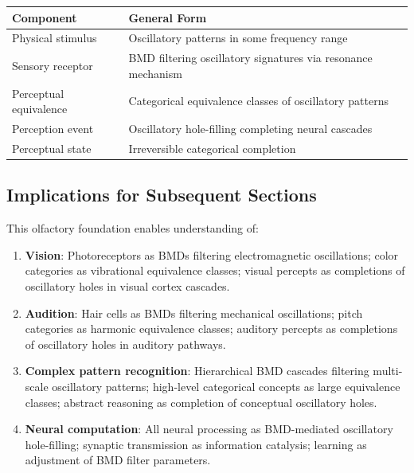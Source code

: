 \documentclass[12pt,a4paper]{article}
\begin{document}
\begin{center}
\begin{tabular}{p{4cm}p{10cm}}
\toprule
\textbf{Component} & \textbf{General Form} \\
\midrule
Physical stimulus & Oscillatory patterns in some frequency range \\
Sensory receptor & BMD filtering oscillatory signatures via resonance mechanism \\
Perceptual equivalence & Categorical equivalence classes of oscillatory patterns \\
Perception event & Oscillatory hole-filling completing neural cascades \\
Perceptual state & Irreversible categorical completion \\
\bottomrule
\end{tabular}
\end{center}

\subsection{Implications for Subsequent Sections}

This olfactory foundation enables understanding of:

\begin{enumerate}
\item \textbf{Vision}: Photoreceptors as BMDs filtering electromagnetic oscillations; color categories as vibrational equivalence classes; visual percepts as completions of oscillatory holes in visual cortex cascades.

\item \textbf{Audition}: Hair cells as BMDs filtering mechanical oscillations; pitch categories as harmonic equivalence classes; auditory percepts as completions of oscillatory holes in auditory pathways.

\item \textbf{Complex pattern recognition}: Hierarchical BMD cascades filtering multi-scale oscillatory patterns; high-level categorical concepts as large equivalence classes; abstract reasoning as completion of conceptual oscillatory holes.

\item \textbf{Neural computation}: All neural processing as BMD-mediated oscillatory hole-filling; synaptic transmission as information catalysis; learning as adjustment of BMD filter parameters.

\end{enumerate}
\end{document}
